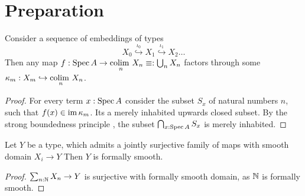 \documentclass{article}
\begin{document}
\section{Preparation}

\begin{lemma}{\label{lemma:StrongBoundedness}}
	Consider a sequence of embeddings of types 
	\[
	X_0 \overset{\iota_0}{\hookrightarrow} X_1 \overset{\iota_1}{\hookrightarrow} X_2 \hdots
	\]
	Then any map $f : \operatorname{Spec} A \to \underset{n}{\mathrm{colim} \ } X_n \equiv: \bigcup_n X_n$ factors through some $\kappa_m : X_m \hookrightarrow \underset{n}{\mathrm{colim} \ } X_n$.
\end{lemma}
\begin{proof}	
	For every term $x : \operatorname{Spec} A$ consider the subset $S_x$ of natural numbers $n$, such that $f(x) \in \operatorname{im} \kappa_m$. Its a merely inhabited upwards closed subset. By the strong boundedness principle \todocite, the subset $\bigcap_{x : \operatorname{Spec} A} S_x$ is merely inhabited.
\end{proof}
\begin{lemma}{\label{lemma:SeqUnionSmooth}}

	Let $Y$ be a type, which admits a jointly surjective family of maps with smooth domain $X_i \to Y$ %
	Then $Y$ is formally smooth. %
\end{lemma}
\begin{proof}
	$ \sum_{n : \mathbb{N}} X_n \to Y$ is surjective with formally smooth domain, as $\mathbb{N}$ is formally smooth.
\end{proof}
\end{document}
